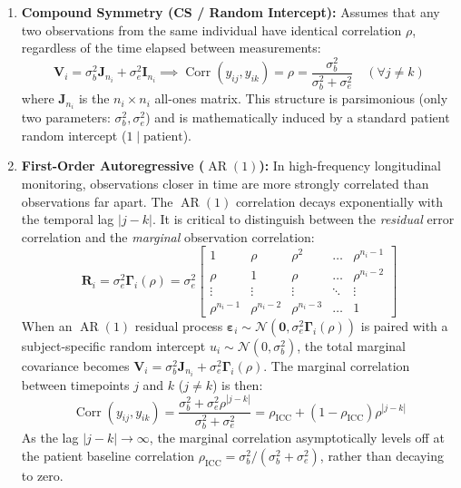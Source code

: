 \documentclass[11pt,twoside,openright]{book}
\begin{document}
\begin{enumerate}
    \item \textbf{Compound Symmetry (CS / Random Intercept):}
    Assumes that any two observations from the same individual have identical correlation $\rho$, regardless of the time elapsed between measurements:
    \begin{equation}
    \label{eq:cs_structure}
    \mathbf{V}_i = \sigma_b^2 \mathbf{J}_{n_i} + \sigma_e^2 \mathbf{I}_{n_i} \implies \operatorname{Corr}(y_{ij}, y_{ik}) = \rho = \frac{\sigma_b^2}{\sigma_b^2 + \sigma_e^2} \quad (\forall j \neq k)
    \end{equation}
    where $\mathbf{J}_{n_i}$ is the $n_i \times n_i$ all-ones matrix. This structure is parsimonious (only two parameters: $\sigma_b^2, \sigma_e^2$) and is mathematically induced by a standard patient random intercept ($1 \mid \text{patient}$).
    
    \item \textbf{First-Order Autoregressive ($\operatorname{AR}(1)$):}
    In high-frequency longitudinal monitoring, observations closer in time are more strongly correlated than observations far apart. The $\operatorname{AR}(1)$ correlation decays exponentially with the temporal lag $|j - k|$. It is critical to distinguish between the \textit{residual} error correlation and the \textit{marginal} observation correlation:
    \begin{equation}
    \label{eq:ar1_structure}
    \mathbf{R}_i = \sigma_e^2 \boldsymbol{\Gamma}_i(\rho) = \sigma_e^2 \begin{bmatrix} 
    1 & \rho & \rho^2 & \dots & \rho^{n_i-1} \\ 
    \rho & 1 & \rho & \dots & \rho^{n_i-2} \\ 
    \vdots & \vdots & \vdots & \ddots & \vdots \\ 
    \rho^{n_i-1} & \rho^{n_i-2} & \rho^{n_i-3} & \dots & 1 
    \end{bmatrix}
    \end{equation}
    When an $\operatorname{AR}(1)$ residual process $\boldsymbol{\varepsilon}_i \sim \mathcal{N}(\mathbf{0}, \sigma_e^2 \boldsymbol{\Gamma}_i(\rho))$ is paired with a subject-specific random intercept $u_i \sim \mathcal{N}(0, \sigma_b^2)$, the total marginal covariance becomes $\mathbf{V}_i = \sigma_b^2 \mathbf{J}_{n_i} + \sigma_e^2 \boldsymbol{\Gamma}_i(\rho)$. The marginal correlation between timepoints $j$ and $k$ ($j \neq k$) is then:
    \begin{equation}
    \label{eq:ar1_marginal_corr}
    \operatorname{Corr}(y_{ij}, y_{ik}) = \frac{\sigma_b^2 + \sigma_e^2 \rho^{|j - k|}}{\sigma_b^2 + \sigma_e^2} = \rho_{\text{ICC}} + (1 - \rho_{\text{ICC}}) \rho^{|j - k|}
    \end{equation}
    As the lag $|j - k| \to \infty$, the marginal correlation asymptotically levels off at the patient baseline correlation $\rho_{\text{ICC}} = \sigma_b^2 / (\sigma_b^2 + \sigma_e^2)$, rather than decaying to zero.
    

\end{enumerate}
\end{document}
